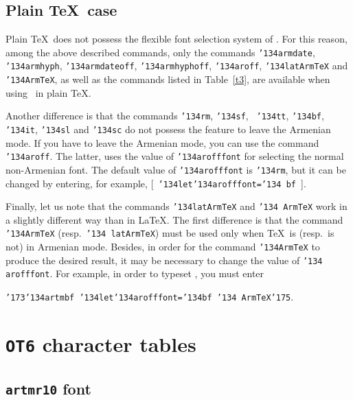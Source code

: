 \documentclass[12pt,a4paper,draft]{article}
\def\mybs{\char'134}
\def\mylbrace{\char'173}
\def\myrbrace{\char'175}
\def\myindent{\leavevmode}
\begin{document}
\subsection{Plain \TeX\ case}

\myindent Plain \TeX\ does not possess the flexible font selection system of
\LaTeXe. For this reason, among the above described commands, only the
commands {\tt \mybs armdate}, {\tt \mybs armhyph}, {\tt \mybs armdateoff},
{\tt \mybs armhyphoff}, {\tt \mybs aroff}, {\tt \mybs latArmTeX} and {\tt
  \mybs ArmTeX}, as well as the commands listed in Table~\ref{t3}, are
available when using \latArmTeX\ in plain \TeX.

Another difference is that the commands {\tt \mybs rm}, {\tt \mybs sf}, {\tt
  \mybs tt}, {\tt \mybs bf}, {\tt \mybs it}, {\tt \mybs sl} and {\tt \mybs sc}
do not possess the feature to leave the Armenian mode. If you have to leave
the Armenian mode, you can use the command {\tt \mybs aroff}. The latter, uses
the value of {\tt \mybs arofffont} for selecting the normal non-Armenian
font. The default value of {\tt \mybs arofffont} is {\tt\mybs rm}, but it can
be changed by entering, for example, [~{\tt \mybs let\mybs arofffont=\mybs
    bf}~].

Finally, let us note that the commands {\tt \mybs latArmTeX} and {\tt \mybs
  ArmTeX} work in a slightly different way than in \LaTeX. The first
difference is that the command {\tt \mybs ArmTeX} (resp.\ {\tt \mybs
  latArmTeX}) must be used only when \TeX\ is (resp.\ is not) in Armenian
mode. Besides, in order for the command {\tt \mybs ArmTeX} to produce the
desired result, it may be necessary to change the value of {\tt \mybs
  arofffont}. For example, in order to typeset \armbf{<<\ArmTeX>>}, you must
enter

{\tt\mylbrace \mybs artmbf \mybs let\mybs arofffont=\mybs bf \mybs
  ArmTeX\myrbrace}\qquad.




\newpage\appendix
{}
\section{{\tt\bfseries OT6} character tables}
\subsection{{\tt\bfseries artmr10} font}
\end{document}
